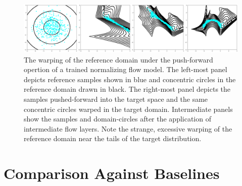 \begin{figure}[htbp]
    \caption[Illustration of domain warping for synthetic 2-d distribution]{
        The warping of the reference domain under the push-forward opertion of a trained normalizing flow model.
        The left-most panel depicts reference samples shown in blue and concentric circles in the reference domain
        drawn in black.
        The right-most panel depicts the samples pushed-forward into the target space and the same concentric circles
        warped in the target domain.
        Intermediate panels show the samples and domain-circles after the application of intermediate flow layers.
        Note the strange, excessive warping of the reference domain near the tails of the target distribution.
    }
    \begin{center}
        \setlength{\fboxsep}{0pt}%
        \setlength{\fboxrule}{1pt}%
        \includegraphics[width=120mm]{figs/nf_circs}
    \end{center}
    \label{fig:flow_circs}
\end{figure}

\section{Comparison Against Baselines}\label{sec:comparison-against-baselines}

